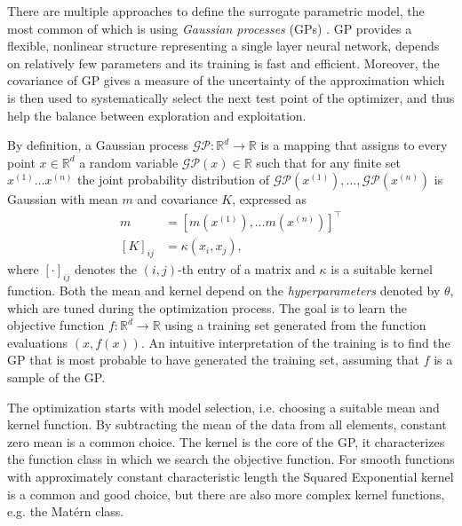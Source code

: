 There are multiple approaches to define the surrogate parametric model, the most common of which is using \textit{Gaussian processes} (GPs) \cite{RW2006, GPMPC2019}. GP provides a flexible, nonlinear structure representing a single layer neural network, depends on relatively few parameters and its training is fast and efficient. Moreover, the covariance of GP gives a measure of the uncertainty of the approximation which is then used to systematically select the next test point of the optimizer, and thus help the balance between exploration and exploitation.

By definition, a Gaussian process $\mathcal{GP}: \mathbb{R}^{d} \rightarrow \mathbb{R}$ is a mapping that assigns to every point $x \in \mathbb{R}^{d}$ a random variable $\mathcal{G} \mathcal{P}(x) \in \mathbb{R}$ such that for any finite set $x^{(1)} \ldots x^{(n)}$ the joint probability distribution of $\mathcal{G} \mathcal{P}\left(x^{(1)}\right), \ldots, \mathcal{G} \mathcal{P}\left(x^{(n)}\right)$ is Gaussian with mean $m$ and covariance $K$, expressed as
\begin{subequations}
\begin{align}
m &=\left[m\left(x^{(1)}\right), \ldots m\left(x^{(n)}\right)\right]^{\top} \\
[K]_{i j} &=\kappa\left(x_{i}, x_{j}\right),
\end{align}
\end{subequations}
where $[\cdot]_{i j}$ denotes the $(i, j)$-th entry of a matrix and $\kappa$ is a suitable kernel function. Both the mean and kernel depend on the \textit{hyperparameters} denoted by $\theta$, which are tuned during the optimization process. The goal is to learn the objective function $f:\mathbb{R}^d \rightarrow \mathbb{R}$ using a training set generated from the function evaluations $(x, f(x))$. An intuitive interpretation of the training is to find the GP that is most probable to have generated the training set, assuming that $f$ is a sample of the GP. 

The optimization starts with model selection, i.e. choosing a suitable mean and kernel function. By subtracting the mean of the data from all elements, constant zero mean is a common choice. The kernel is the core of the GP, it characterizes the function class in which we search the objective function. For smooth functions with approximately constant characteristic length the Squared Exponential kernel is a common and good choice, but there are also more complex kernel functions, e.g. the Matérn class.

